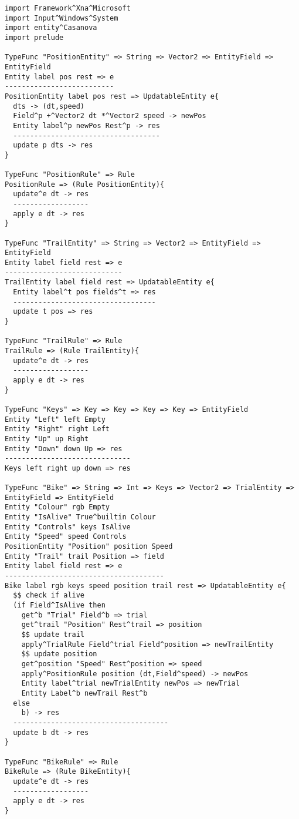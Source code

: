 \begin{lstlisting}
import Framework^Xna^Microsoft
import Input^Windows^System
import entity^Casanova
import prelude

TypeFunc "PositionEntity" => String => Vector2 => EntityField => EntityField
Entity label pos rest => e
--------------------------
PositionEntity label pos rest => UpdatableEntity e{
  dts -> (dt,speed)
  Field^p +^Vector2 dt *^Vector2 speed -> newPos
  Entity label^p newPos Rest^p -> res
  -----------------------------------
  update p dts -> res
}

TypeFunc "PositionRule" => Rule
PositionRule => (Rule PositionEntity){
  update^e dt -> res
  ------------------
  apply e dt -> res
}

TypeFunc "TrailEntity" => String => Vector2 => EntityField => EntityField
Entity label field rest => e
----------------------------
TrailEntity label field rest => UpdatableEntity e{
  Entity label^t pos fields^t => res
  ----------------------------------
  update t pos => res
}

TypeFunc "TrailRule" => Rule
TrailRule => (Rule TrailEntity){
  update^e dt -> res
  ------------------
  apply e dt -> res
}

TypeFunc "Keys" => Key => Key => Key => Key => EntityField
Entity "Left" left Empty
Entity "Right" right Left
Entity "Up" up Right
Entity "Down" down Up => res
------------------------------
Keys left right up down => res

TypeFunc "Bike" => String => Int => Keys => Vector2 => TrialEntity => EntityField => EntityField
Entity "Colour" rgb Empty
Entity "IsAlive" True^builtin Colour
Entity "Controls" keys IsAlive
Entity "Speed" speed Controls
PositionEntity "Position" position Speed
Entity "Trail" trail Position => field
Entity label field rest => e
--------------------------------------
Bike label rgb keys speed position trail rest => UpdatableEntity e{
  $$ check if alive
  (if Field^IsAlive then
    get^b "Trial" Field^b => trial
    get^trail "Position" Rest^trail => position
    $$ update trail
    apply^TrialRule Field^trial Field^position => newTrailEntity
    $$ update position
    get^position "Speed" Rest^position => speed
    apply^PositionRule position (dt,Field^speed) -> newPos
    Entity label^trial newTrialEntity newPos => newTrial
    Entity Label^b newTrail Rest^b
  else
    b) -> res
  -------------------------------------
  update b dt -> res
}

TypeFunc "BikeRule" => Rule
BikeRule => (Rule BikeEntity){
  update^e dt -> res
  ------------------
  apply e dt -> res
}
\end{lstlisting}


